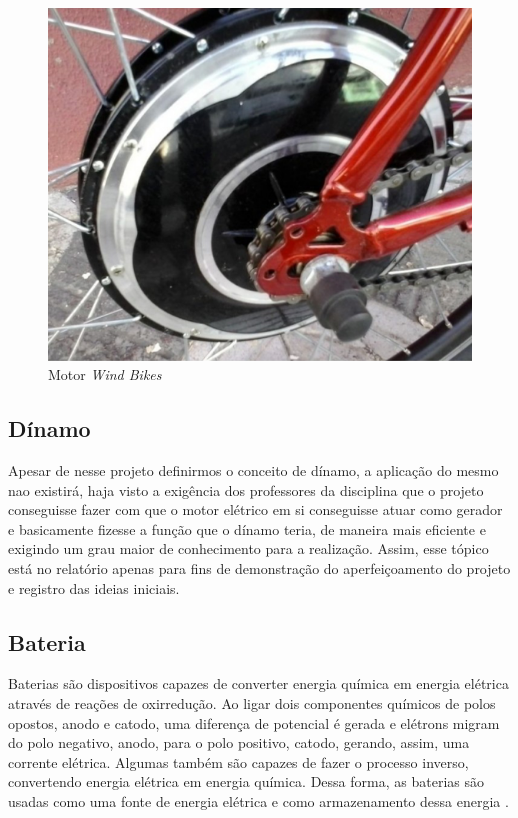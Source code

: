 \graphicspath{{figuras/}}
\begin{figure}[h!]
\centering
\includegraphics[scale=0.80]{motor.png}
\caption{Motor \textit{Wind Bikes}}
\label{img:motor}
\end{figure}
	
	\subsection{Dínamo}
	Apesar de nesse projeto definirmos o conceito de dínamo, a aplicação do mesmo nao existirá, haja visto a exigência dos professores da disciplina que o projeto conseguisse fazer com que o motor elétrico em si conseguisse atuar como gerador e basicamente fizesse a função que o dínamo teria, de maneira mais eficiente e exigindo um grau maior de conhecimento para a realização. Assim, esse tópico está no relatório apenas para fins de demonstração do aperfeiçoamento do projeto e registro das ideias iniciais. 

  
\subsection{Bateria}
Baterias são dispositivos capazes de converter energia química em energia elétrica através de reações de oxirredução. Ao ligar dois componentes químicos de polos opostos, anodo e catodo, uma diferença de potencial é gerada e elétrons migram do polo negativo, anodo, para o polo positivo, catodo, gerando, assim, uma corrente elétrica. Algumas também são capazes de fazer o processo inverso, convertendo energia elétrica em energia química. Dessa forma, as baterias são usadas como uma fonte de energia elétrica e como armazenamento dessa energia \cite{varela}.
	
